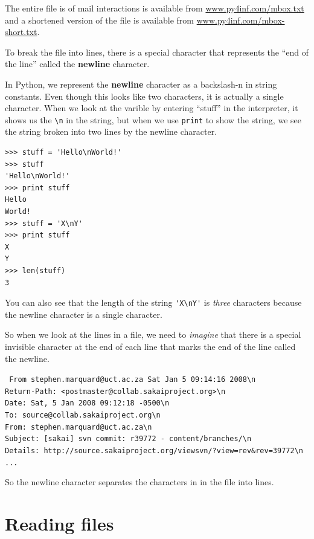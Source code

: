\documentclass[10pt]{book}
\begin{document}
The entire file is of mail interactions is available from 
\url{www.py4inf.com/mbox.txt} 
and a shortened version of the file is available from
\url{www.py4inf.com/mbox-short.txt}.

To break the file into lines, there is a special character that 
represents the ``end of the line'' called the {\bf newline} character.

In Python, we represent the {\bf newline} character as a backslash-n in 
string constants.  Even though this looks like two characters, it
is actually a single character.  When we look at the varible by entering
``stuff'' in the interpreter, it shows us the \verb"\n" in the string, 
but when we use {\tt print} to show the string, we see the string broken
into two lines by the newline character.

\beforeverb
\begin{verbatim}
>>> stuff = 'Hello\nWorld!'
>>> stuff
'Hello\nWorld!'
>>> print stuff
Hello
World!
>>> stuff = 'X\nY'
>>> print stuff
X
Y
>>> len(stuff)
3
\end{verbatim}
\afterverb
%

You can also see that the length of the string \verb"'X\nY'" is {\em three}
characters because the newline character is a single character.

So when we look at the lines in a file, we need to {\em imagine}
that there is a special invisible character at the end of each line
that marks the end of the line called the newline.  

{\tt
From stephen.marquard@uct.ac.za Sat Jan  5 09:14:16 2008\verb"\n"\\
Return-Path: <postmaster@collab.sakaiproject.org>\verb"\n"\\
Date: Sat, 5 Jan 2008 09:12:18 -0500\verb"\n"\\
To: source@collab.sakaiproject.org\verb"\n"\\
From: stephen.marquard@uct.ac.za\verb"\n"\\
Subject: [sakai] svn commit: r39772 - content/branches/\verb"\n"\\
Details: http://source.sakaiproject.org/viewsvn/?view=rev\&rev=39772\verb"\n"\\
...
}

So the newline character separates the characters 
in in the file into lines.

\section{Reading files}
\end{document}
